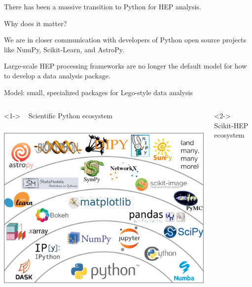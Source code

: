 \documentclass[aspectratio=169]{beamer}
\begin{document}
\begin{frame}{There has been a massive transition to Python for HEP analysis.}
\large
\vspace{0.35 cm}

{\Large Why does it matter?}

\vspace{0.5 cm}
We are in closer communication with developers of Python open source projects like NumPy, Scikit-Learn, and AstroPy.

\vspace{0.5 cm}
Large-scale HEP processing frameworks are no longer the default model for how to develop a data analysis package.
\end{frame}

\begin{frame}{Model: small, specialized packages for Lego-style data analysis}
\vspace{0.75 cm}
\Large

\begin{columns}
\begin{uncoverenv}<1->
\mbox{ } \hfill Scientific Python ecosystem \hfill \mbox{ }

\includegraphics[width=\linewidth]{PLOTS/shells-border.png}
\end{uncoverenv}

\begin{uncoverenv}<2->
\mbox{ } \hfill Scikit-HEP ecosystem \hfill \mbox{ }


\end{uncoverenv}
\end{columns}
\end{frame}
\end{document}
